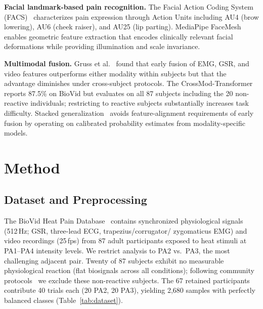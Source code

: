 \documentclass[sigconf]{acmart}
\begin{document}
\textbf{Facial landmark-based pain recognition.}
The Facial Action Coding System (FACS)~\cite{ekman1978} characterizes pain
expression through Action Units including AU4 (brow lowering), AU6 (cheek
raiser), and AU25 (lip parting). MediaPipe FaceMesh~\cite{lugaresi2019}
enables geometric feature extraction that encodes clinically relevant facial
deformations while providing illumination and scale invariance.

\textbf{Multimodal fusion.}
Gruss et al.~\cite{gruss2015} found that early fusion of EMG, GSR, and video
features outperforms either modality within subjects but that the advantage
diminishes under cross-subject protocols. The CrossMod-Transformer~\cite{farmani2025}
reports 87.5\% on BioVid but evaluates on all 87 subjects including the
20 non-reactive individuals; restricting to reactive subjects substantially
increases task difficulty. Stacked generalization~\cite{wolpert1992,breiman1996}
avoids feature-alignment requirements of early fusion by operating on
calibrated probability estimates from modality-specific models.

\section{Method}
\label{sec:method}

\subsection{Dataset and Preprocessing}

The BioVid Heat Pain Database~\cite{walter2013} contains synchronized
physiological signals (512\,Hz; GSR, three-lead ECG, trapezius/corrugator/
zygomaticus EMG) and video recordings (25\,fps) from 87 adult participants
exposed to heat stimuli at PA1--PA4 intensity levels. We restrict analysis
to PA2 vs.\ PA3, the most challenging adjacent pair. Twenty of 87 subjects
exhibit no measurable physiological reaction (flat biosignals across all
conditions); following community protocols~\cite{gruss2015} we exclude these
non-reactive subjects. The 67 retained participants contribute 40 trials each
(20 PA2, 20 PA3), yielding 2,680 samples with perfectly balanced classes
(Table~\ref{tab:dataset}).
\end{document}
